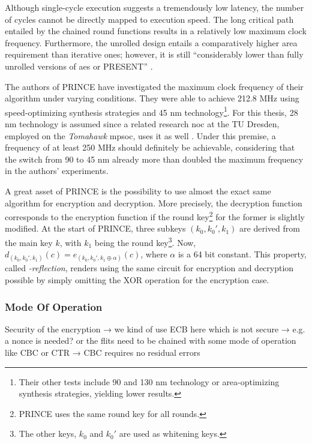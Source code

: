 Although single-cycle execution suggests a tremendously low latency, the number of cycles cannot be directly mapped to execution speed. The long critical path
entailed by the chained round functions results in a relatively low maximum clock frequency. Furthermore, the unrolled design entails a comparatively
higher area requirement than iterative ones; however, it is still \enquote{considerably lower than fully unrolled versions of \gls{aes} or PRESENT}
\cite[3]{borghoff12prince}.

The authors of PRINCE have investigated the maximum clock frequency of their algorithm under varying conditions. They were able to achieve 212.8 MHz
using speed-optimizing synthesis strategies and 45 nm technology\footnote{Their other tests include 90 and 130 nm technology or area-optimizing
synthesis strategies, yielding lower results.}. For this thesis, 28 nm technology is assumed since a related research \gls{noc} at the TU Dresden,
employed on the \textit{Tomahawk} \gls{mpsoc}, uses it as well \cite[35]{cfaedreport}. Under this premise, a frequency of at least 250 MHz should
definitely be achievable, considering that the switch from 90 to 45 nm already more than doubled the maximum frequency in the authors' experiments.

A great asset of PRINCE is the possibility to use almost the exact same algorithm for encryption and decryption. More precisely, the decryption
function corresponds to the encryption function if the round key\footnote{PRINCE uses the same round key for all rounds.} for the former is slightly
modified. At the start of PRINCE, three subkeys $(k_0, k_0', k_1)$ are derived from the main key $k$, with $k_1$ being the round key\footnote{The
other keys, $k_0$ and $k_0'$ are used as whitening keys.}. Now, $d_{(k_0, k_0', k_1)}(c) = e_{(k_0, k_0', k_1 \oplus \alpha)}(c)$, where $\alpha$ is a
64 bit constant. This property, called \textit{\alpha-reflection}, renders using the same circuit for encryption and decryption possible by simply
omitting the XOR operation for the encryption case.

\subsubsection{Mode Of Operation}
Security of the encryption → we kind of use ECB here which is not secure → e.g. a nonce is needed? or the flits need to be chained with some
mode of operation like CBC or CTR → CBC requires no residual errors

